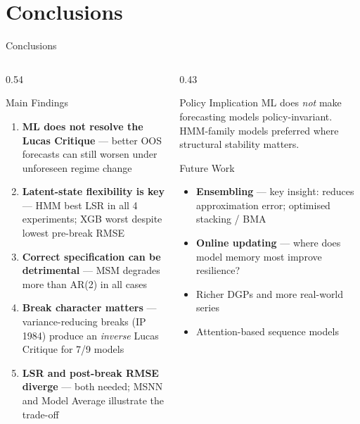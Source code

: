 \documentclass[aspectratio=169, 10pt]{beamer}
\begin{document}
\section{Conclusions}

\begin{frame}{Conclusions}

  \begin{columns}[T]
    \begin{column}{0.54\textwidth}
      \begin{block}{Main Findings}
        \begin{enumerate}\setlength\itemsep{4pt}\small
          \item \textbf{ML does not resolve the Lucas Critique} — better OOS forecasts can still worsen under unforeseen regime change
          \item \textbf{Latent-state flexibility is key} — HMM best LSR in all 4 experiments; XGB worst despite lowest pre-break RMSE
          \item \textbf{Correct specification can be detrimental} — MSM degrades more than AR(2) in all cases
          \item \textbf{Break character matters} — variance-reducing breaks (IP 1984) produce an \emph{inverse} Lucas Critique for 7/9 models
          \item \textbf{LSR and post-break RMSE diverge} — both needed; MSNN and Model Average illustrate the trade-off
        \end{enumerate}
      \end{block}
    \end{column}
    \begin{column}{0.43\textwidth}
      \begin{alertblock}{Policy Implication}
        ML does \emph{not} make forecasting models policy-invariant. HMM-family models preferred where structural stability matters.
      \end{alertblock}

      \vspace{6pt}
      \begin{block}{Future Work}
        \begin{itemize}\setlength\itemsep{3pt}
          \item \textbf{Ensembling} — key insight: reduces approximation error; optimised stacking / BMA
          \item \textbf{Online updating} — where does model memory most improve resilience?
          \item Richer DGPs and more real-world series
          \item Attention-based sequence models
        \end{itemize}
      \end{block}
    \end{column}
  \end{columns}

\end{frame}
\end{document}
